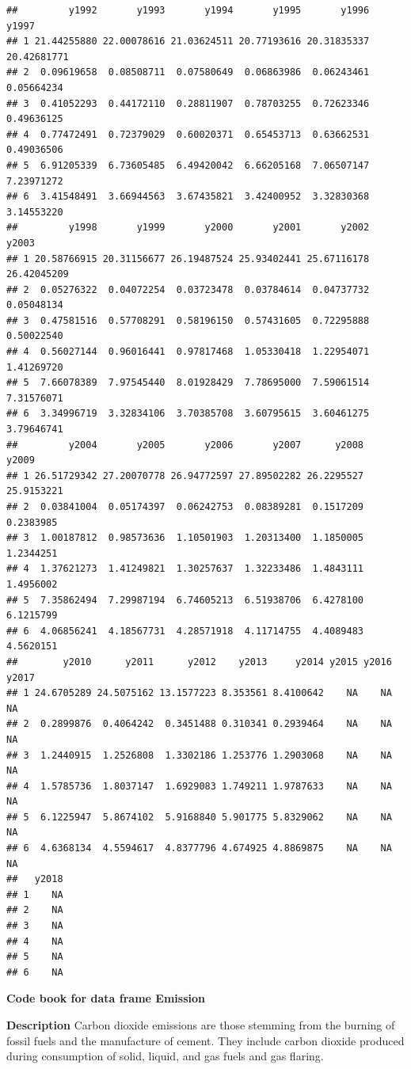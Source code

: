 \documentclass[]{book}
\begin{document}
\begin{verbatim}
##         y1992       y1993       y1994       y1995       y1996       y1997
## 1 21.44255880 22.00078616 21.03624511 20.77193616 20.31835337 20.42681771
## 2  0.09619658  0.08508711  0.07580649  0.06863986  0.06243461  0.05664234
## 3  0.41052293  0.44172110  0.28811907  0.78703255  0.72623346  0.49636125
## 4  0.77472491  0.72379029  0.60020371  0.65453713  0.63662531  0.49036506
## 5  6.91205339  6.73605485  6.49420042  6.66205168  7.06507147  7.23971272
## 6  3.41548491  3.66944563  3.67435821  3.42400952  3.32830368  3.14553220
##         y1998       y1999       y2000       y2001       y2002       y2003
## 1 20.58766915 20.31156677 26.19487524 25.93402441 25.67116178 26.42045209
## 2  0.05276322  0.04072254  0.03723478  0.03784614  0.04737732  0.05048134
## 3  0.47581516  0.57708291  0.58196150  0.57431605  0.72295888  0.50022540
## 4  0.56027144  0.96016441  0.97817468  1.05330418  1.22954071  1.41269720
## 5  7.66078389  7.97545440  8.01928429  7.78695000  7.59061514  7.31576071
## 6  3.34996719  3.32834106  3.70385708  3.60795615  3.60461275  3.79646741
##         y2004       y2005       y2006       y2007      y2008      y2009
## 1 26.51729342 27.20070778 26.94772597 27.89502282 26.2295527 25.9153221
## 2  0.03841004  0.05174397  0.06242753  0.08389281  0.1517209  0.2383985
## 3  1.00187812  0.98573636  1.10501903  1.20313400  1.1850005  1.2344251
## 4  1.37621273  1.41249821  1.30257637  1.32233486  1.4843111  1.4956002
## 5  7.35862494  7.29987194  6.74605213  6.51938706  6.4278100  6.1215799
## 6  4.06856241  4.18567731  4.28571918  4.11714755  4.4089483  4.5620151
##        y2010      y2011      y2012    y2013     y2014 y2015 y2016 y2017
## 1 24.6705289 24.5075162 13.1577223 8.353561 8.4100642    NA    NA    NA
## 2  0.2899876  0.4064242  0.3451488 0.310341 0.2939464    NA    NA    NA
## 3  1.2440915  1.2526808  1.3302186 1.253776 1.2903068    NA    NA    NA
## 4  1.5785736  1.8037147  1.6929083 1.749211 1.9787633    NA    NA    NA
## 5  6.1225947  5.8674102  5.9168840 5.901775 5.8329062    NA    NA    NA
## 6  4.6368134  4.5594617  4.8377796 4.674925 4.8869875    NA    NA    NA
##   y2018
## 1    NA
## 2    NA
## 3    NA
## 4    NA
## 5    NA
## 6    NA
\end{verbatim}

\textbf{Code book for data frame Emission}

\textbf{Description}
Carbon dioxide emissions are those stemming from the burning of fossil fuels and the manufacture of cement. They include carbon dioxide produced during consumption of solid, liquid, and gas fuels and gas flaring.
\end{document}
